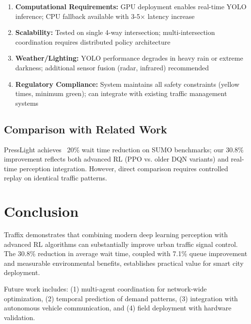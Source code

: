 \documentclass[10pt,conference]{IEEEtran}
\begin{document}
\begin{enumerate}
    \item \textbf{Computational Requirements:} GPU deployment enables real-time YOLO inference; CPU fallback available with 3-5× latency increase
    \item \textbf{Scalability:} Tested on single 4-way intersection; multi-intersection coordination requires distributed policy architecture
    \item \textbf{Weather/Lighting:} YOLO performance degrades in heavy rain or extreme darkness; additional sensor fusion (radar, infrared) recommended
    \item \textbf{Regulatory Compliance:} System maintains all safety constraints (yellow times, minimum green); can integrate with existing traffic management systems
\end{enumerate}

\subsection{Comparison with Related Work}

PressLight achieves ~20\% wait time reduction on SUMO benchmarks; our 30.8\% improvement reflects both advanced RL (PPO vs. older DQN variants) and real-time perception integration. However, direct comparison requires controlled replay on identical traffic patterns.

\section{Conclusion}

Traffix demonstrates that combining modern deep learning perception with advanced RL algorithms can substantially improve urban traffic signal control. The 30.8\% reduction in average wait time, coupled with 7.1\% queue improvement and measurable environmental benefits, establishes practical value for smart city deployment.

Future work includes: (1) multi-agent coordination for network-wide optimization, (2) temporal prediction of demand patterns, (3) integration with autonomous vehicle communication, and (4) field deployment with hardware validation.
\end{document}

